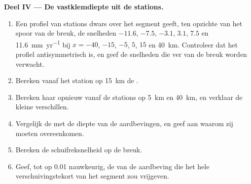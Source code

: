\begin{problem}
\medskip
\noindent\textbf{Deel IV --- De vastklemdiepte uit de stations.}
\begin{enumerate}[resume]
  \item Een profiel van stations dwars over het segment geeft, ten opzichte van het spoor van de breuk, de snelheden $-11.6$, $-7.5$, $-3.1$, $3.1$, $7.5$ en
\qty{11.6}{mm.yr^{-1}} bij $x = -40$, $-15$, $-5$, $5$, $15$ en
\qty{40}{km}. Controleer dat het profiel antisymmetrisch is, en geef de snelheden die ver van de breuk worden verwacht.
  \item Bereken vanaf het station op \qty{15}{km} de .
  \item Bereken haar opnieuw vanaf de stations op \qty{5}{km} en \qty{40}{km}, en verklaar de kleine verschillen.
  \item Vergelijk de  met de diepte van de aardbevingen, en geef aan waarom zij moeten overeenkomen.
  \item Bereken de schuifreksnelheid op de breuk.
  \item Geef, tot op 0.01 nauwkeurig, de  van de aardbeving die het hele verschuivingstekort van het segment zou vrijgeven.
\end{enumerate}
\end{problem}
